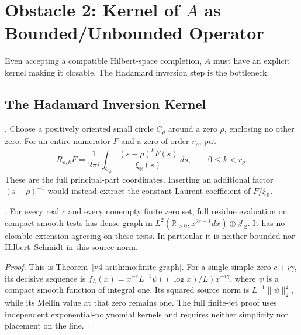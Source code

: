 \section{Obstacle 2: Kernel of \(A\) as Bounded/Unbounded Operator}
\label{v4-arith:w9-r4:obstacle-kernel}

Even accepting a compatible Hilbert-space completion, \(A\) must have
an explicit kernel making it closable. The Hadamard inversion step is
the bottleneck.

\subsection{The Hadamard Inversion Kernel}
\label{v4-arith:w9-r4:obstacle-kernel:had}

\begin{definition}
\label{v4-arith:w9-r4:def:formal-had-kernel}
\ClaimStatusDefinitional. Choose a positively oriented small circle
$C_\rho$ around a zero $\rho$, enclosing no other zero. For an
entire numerator $F$ and a zero of order $r_\rho$, put
\[
 R_{\rho,k}F=\frac1{2\pi i}\int_{C_\rho}
       \frac{(s-\rho)^kF(s)}{\xi_{\mathbb R}(s)}\,ds,
 \qquad 0\leq k<r_\rho.
\]
These are the full principal-part coordinates. Inserting an
additional factor $(s-\rho)^{-1}$ would instead extract the
constant Laurent coefficient of $F/\xi_{\mathbb R}$.
\end{definition}

\begin{lemma}
\label{v4-arith:w9-r4:lem:had-not-HS}
\ClaimStatusProvedHere. For every real $c$ and every nonempty finite
zero set, full residue evaluation on compact smooth tests has
dense graph in
$L^2(\mathbb R_{>0},x^{2c-1}dx)\oplus\mathscr J_Z$.
It has no closable extension agreeing on these tests. In particular
it is neither bounded nor Hilbert--Schmidt in this source norm.
\end{lemma}
\begin{proof}
This is Theorem~\ref{v4-arith:mo:finite-graph}. For a single simple zero
$c+i\gamma$, its decisive sequence is
$f_L(x)=x^{-c}L^{-1}\psi((\log x)/L)x^{-i\gamma}$,
where $\psi$ is a compact smooth function of integral one.
Its squared source norm is $L^{-1}\|\psi\|_2^2$, while its
Mellin value at that zero remains one. The full finite-jet proof
uses independent exponential-polynomial kernels and requires
neither simplicity nor placement on the line.
\end{proof}

